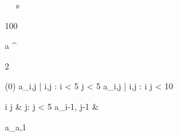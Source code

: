 \begin{eqcode}{\mu}{\ }{\ }{}
  s \gets \begin {tmatrix}
  100  \lend
  \end{tmatrix} \lend
  a \gets \genar \limits ^{\begin{tmatrix} 2  \lend \end{tmatrix}} (0) \lend
  a_{i,j} | i,j : i < 5 \cap j < 5  \lend
  a_{i,j} | i,j : i  \cap j < 10 \gets
  \begin{cases}
    i \cdot j & j: j < 5 \lend
    a_{i-1, j-1} & \otherwise \lend
  \end{cases} \lend
  a_{a,1}  \lend %
   \lend
\end{eqcode}
